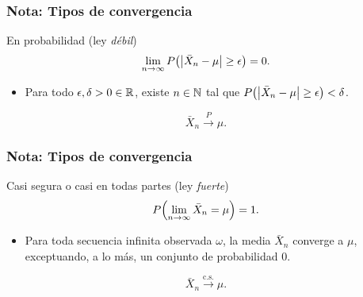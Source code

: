 \documentclass[table]{beamer}
\begin{document}


\begin{frame}
    \frametitle{Nota: Tipos de convergencia}
    \begin{block}{En probabilidad (ley \emph{débil})}
        \begin{equation*}
            \lim_{n \rightarrow \infty} \prob{\vparens{\bar{X}_{n} - \mu} \geq \epsilon} = 0 .
        \end{equation*}
        \begin{itemize}
            \item Para todo $\epsilon, \delta > 0 \in \mathbb{R}$, existe $n \in \mathbb{N}$ tal que $\prob{\vparens{\bar{X}_{n} - \mu} \geq \epsilon} < \delta$.
        \end{itemize}
        \begin{equation*}
            \bar{X}_{n} \overset{P}{\to} \mu .
        \end{equation*}
    \end{block}
\end{frame}

\begin{frame}
    \frametitle{Nota: Tipos de convergencia}
   \begin{block}{Casi segura o casi en todas partes (ley \emph{fuerte})}
        \begin{equation*}
            \prob{\lim_{n \rightarrow \infty} \bar{X}_{n} = \mu} = 1 .
        \end{equation*}
        \begin{itemize}
            \item Para toda secuencia infinita observada $\omega$, la media $\bar{X}_{n}$ converge a $\mu$, exceptuando, a lo más, un conjunto de probabilidad $0$.
        \end{itemize}
        \begin{equation*}
            \bar{X}_{n} \overset{\text{c.s.}}{\to} \mu .
        \end{equation*}
    \end{block}
\end{frame}
\end{document}
